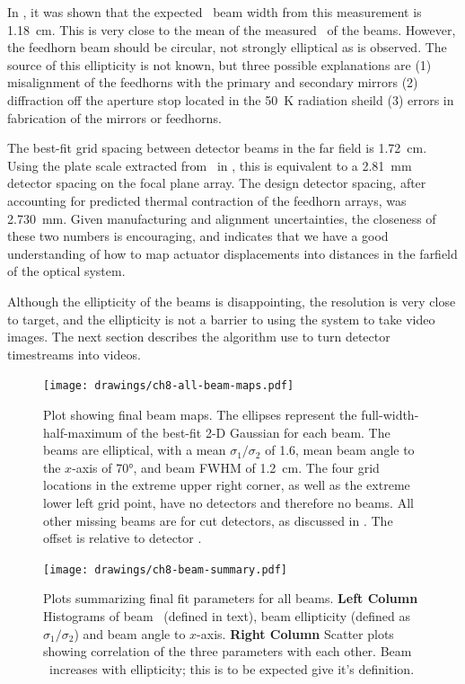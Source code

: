 In , it was shown that the expected \FWHM\ beam width from this measurement is \SI{1.18}{\cm}.
This is very close to the mean of the measured \FWHM\ of the beams.
However, the feedhorn beam should be circular, not strongly elliptical as is observed.
The source of this ellipticity is not known, but three possible explanations are (1) misalignment of the feedhorns with the primary and secondary mirrors (2) diffraction off the aperture stop located in the \SI{50}{\kelvin} radiation sheild (3) errors in fabrication of the mirrors or feedhorns.

The best-fit grid spacing between detector beams in the far field is \SI{1.72}{\cm}.
Using the plate scale extracted from \ZEMAX\ in , this is equivalent to a \SI{2.81}{\mm} detector spacing on the focal plane array.
The design detector spacing, after accounting for predicted thermal contraction of the feedhorn arrays, was \SI{2.730}{\mm}.
Given manufacturing and alignment uncertainties, the closeness of these two numbers is encouraging, and indicates that we have a good understanding of how to map actuator displacements into distances in the farfield of the optical system.

Although the ellipticity of the beams is disappointing, the resolution is very close to target, and the ellipticity is not a barrier to using the system to take video images. The next section describes the algorithm use to turn detector timestreams into videos.

\begin{figure}[th]
\centering
\texttt{[image: drawings/ch8-all-beam-maps.pdf]}
\caption{
Plot showing final beam maps.
The ellipses represent the full-width-half-maximum of the best-fit 2-D Gaussian for each beam. The beams are elliptical, with a mean $\sigma_1/\sigma_2$ of 1.6, mean beam angle to the $x$-axis of \ang{70}, and beam FWHM of \SI{1.2}{\cm}.
The four grid locations in the extreme upper right corner, as well as the extreme lower left grid point, have no detectors and therefore no beams. All other missing beams are for cut detectors, as discussed in .
The offset is relative to detector .
}
\label{fig:ch8-all-beam-maps}
\end{figure}

\begin{figure}[th]
\centering
\texttt{[image: drawings/ch8-beam-summary.pdf]}
\caption{
  Plots summarizing final fit parameters for all beams.
  \textbf{Left Column} Histograms of beam \FWHM\ (defined in text), beam ellipticity (defined as $\sigma_1 / \sigma_2$) and beam angle to $x$-axis.
  \textbf{Right Column} Scatter plots showing correlation of the three parameters with each other. Beam \FWHM\ increases with ellipticity; this is to be expected give it's definition.
}
\label{fig:ch8-beam-summary}
\end{figure}

